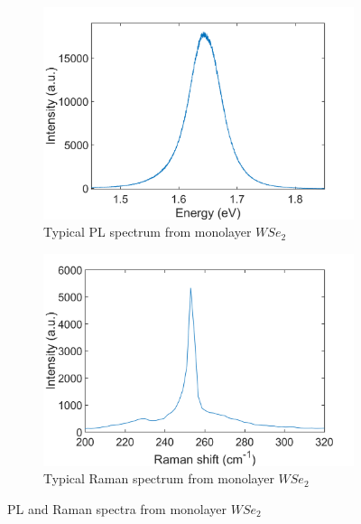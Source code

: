 	
\begin{figure}[!h]
	\begin{center}
		\begin{subfigure}[b]{0.35\textwidth}
			\includegraphics[scale=0.2]{WSe2/PLSpectrum.png}
			\caption{Typical PL spectrum from monolayer $WSe_2$}
			\label{fig:WSe2PLSpectrum}
		\end{subfigure}
		\qquad
		\begin{subfigure}[b]{0.35\textwidth}
			\includegraphics[scale=0.2]{WSe2/RamanSpectrum.png}
			\caption{Typical Raman spectrum from monolayer $WSe_2$}
			\label{fig:WSe2RamanSpectrum}
		\end{subfigure}
		\caption{PL and Raman spectra from monolayer $WSe_2$}
		\label{fig:WSe2PLRamanSpectra}
	\end{center}
\end{figure}
	
